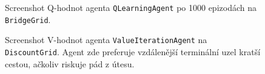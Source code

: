 \begin{figure}[!htbp]
\begin{center}
  \caption{Screenshot Q-hodnot agenta \texttt{QLearningAgent} po 1000 epizodách na \texttt{BridgeGrid}.}
  \label{img:bridgeq}
\end{center}
\end{figure}

\begin{figure}[!htbp]
\begin{center}
  \caption{Screenshot V-hodnot agenta \texttt{ValueIterationAgent} na \texttt{DiscountGrid}. Agent zde preferuje vzdálenější terminální uzel kratší cestou, ačkoliv riskuje pád z útesu.}
  \label{img:discountPolicy}
\end{center}
\end{figure}


